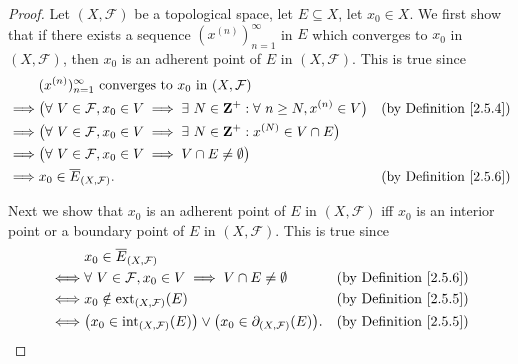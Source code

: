 \begin{proof}
    Let \((X, \mathcal{F})\) be a topological space, let \(E \subseteq X\), let \(x_0 \in X\).
    We first show that if there exists a sequence \((x^{(n)})_{n = 1}^\infty\) in \(E\) which converges to \(x_0\) in \((X, \mathcal{F})\), then \(x_0\) is an adherent point of \(E\) in \((X, \mathcal{F})\).
    This is true since
    \begin{align*}
                 & (x^{(n)})_{n = 1}^\infty \text{ converges to } x_0 \text{ in } (X, \mathcal{F})                                                                              \\
        \implies & \big(\forall\ V \in \mathcal{F}, x_0 \in V \implies \exists\ N \in \mathbf{Z}^+ : \forall\ n \geq N, x^{(n)} \in V\big) & \text{(by Definition \ref{2.5.4})} \\
        \implies & \big(\forall\ V \in \mathcal{F}, x_0 \in V \implies \exists\ N \in \mathbf{Z}^+ : x^{(N)} \in V \cap E\big)                                                  \\
        \implies & \big(\forall\ V \in \mathcal{F}, x_0 \in V \implies V \cap E \neq \emptyset\big)                                                                             \\
        \implies & x_0 \in \overline{E}_{(X, \mathcal{F})}.                                                                                & \text{(by Definition \ref{2.5.6})}
    \end{align*}

    Next we show that \(x_0\) is an adherent point of \(E\) in \((X, \mathcal{F})\) iff \(x_0\) is an interior point or a boundary point of \(E\) in \((X, \mathcal{F})\).
    This is true since
    \begin{align*}
             & x_0 \in \overline{E}_{(X, \mathcal{F})}                                                                                                        \\
        \iff & \forall\ V \in \mathcal{F}, x_0 \in V \implies V \cap E \neq \emptyset                                    & \text{(by Definition \ref{2.5.6})} \\
        \iff & x_0 \notin \text{ext}_{(X, \mathcal{F})}(E)                                                               & \text{(by Definition \ref{2.5.5})} \\
        \iff & \big(x_0 \in \text{int}_{(X, \mathcal{F})}(E)\big) \lor \big(x_0 \in \partial_{(X, \mathcal{F})}(E)\big). & \text{(by Definition \ref{2.5.5})}
    \end{align*}


\end{proof}
